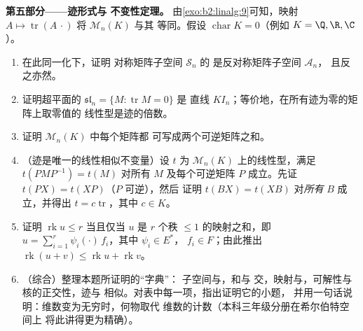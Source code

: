 \begin{problem}
\medskip
\noindent\textbf{第五部分——迹形式与
不变性定理。} 由\cref{exo:b2:linalg:9}可知，映射 $A \mapsto
\operatorname{tr}(A\,\cdot)$ 将 $\mathcal{M}_n(K)$ 与其
        等同。假设 $\operatorname{char} K = 0$（例如 $K = \Q, \R,
\C$）。
\begin{enumerate}[resume]
  \item 在此同一化下，证明
        对称矩阵子空间 $\mathcal{S}_n$ 的
        是反对称矩阵子空间 $\mathcal{A}_n$，
        且反之亦然。
  \item 证明超平面的
        $\mathfrak{sl}_n = \{M : \operatorname{tr} M = 0\}$ 是
        直线 $K I_n$；等价地，在所有迹为零的矩阵上取零值的
        线性型是迹的倍数。
  \item 证明 $\mathcal{M}_n(K)$ 中每个矩阵都
        可写成两个可逆矩阵之和。
  \item （迹是唯一的线性相似不变量）设
        $t$ 为 $\mathcal{M}_n(K)$ 上的线性型，满足
        $t(PMP^{-1}) = t(M)$ 对所有 $M$ 及每个可逆矩阵
        $P$ 成立。先证 $t(PX) = t(XP)$（$P$ 可逆），然后
        证明 $t(BX) = t(XB)$ 对\emph{所有} $B$ 成立，并得出 $t = c
        \operatorname{tr}$，其中 $c \in K$。
  \item 证明 $\operatorname{rk} u \leq r$ 当且仅当 $u$
        是 $r$ 个秩 $\leq 1$ 的映射之和，即 $u =
        \sum_{i=1}^{r} \psi_i(\cdot)\,f_i$，其中 $\psi_i \in E^*$，
        $f_i \in F$；由此推出 $\operatorname{rk}(u + v) \leq
        \operatorname{rk} u + \operatorname{rk} v$。
  \item （综合）整理本题所证明的“字典”：
        子空间与，和与
        交，映射与，可解性与
        核的正交性，迹与
        相似。对表中每一项，指出证明它的小题，
        并用一句话说明：维数变为无穷时，何物取代
        维数的计数（本科三年级分册在希尔伯特空间上
        将此讲得更为精确）。
\end{enumerate}
\end{problem}
